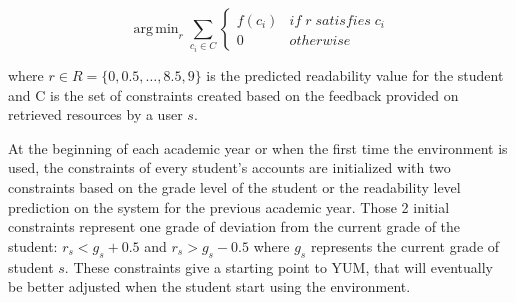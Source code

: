 \documentclass{sig-alternate-05-2015}
\DeclareMathOperator*{\argminA}{arg\,min} %
\begin{document}

\begin{equation}
\argminA_r  \sum_ {c_{i} \in C} \begin{cases}f(c_{i}) & if \; r \;  satisfies \; c_{i}\\0 & otherwise\end{cases}  
\label{formula:tracking}
\end{equation}




\noindent
where $r \in R=\{0,0.5,\dotsc ,8.5,9\}$ is the predicted readability value for the student and C is the set of constraints created based on the feedback provided on retrieved resources by a user $s$.


At the beginning of each academic year or when the first time the environment is used, the constraints of every student's accounts are initialized with two constraints based on the grade level of the student or the readability level prediction on the system for the previous academic year. Those 2 initial constraints represent one grade of deviation from the current grade of the student: $r_s < g_s+0.5$ and $r_s > g_s -0.5$ where $g_s$ represents the current grade of student $s$. These constraints give a starting point to YUM, that will eventually be better adjusted when the student start using the environment. 
\end{document}

